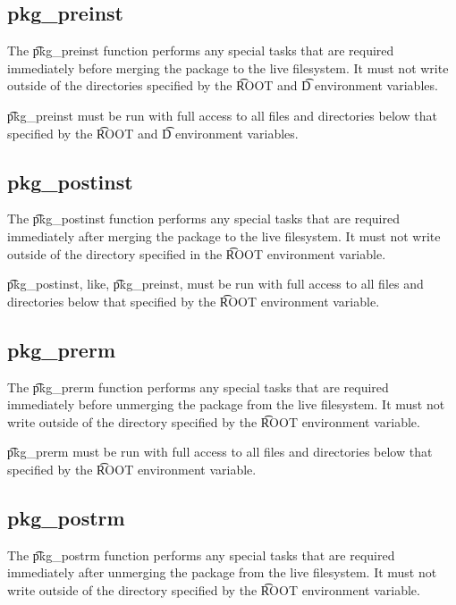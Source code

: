 \subsection{pkg\_preinst}
\label{pkg-preinst-function}

The \t{pkg\_preinst} function performs any special tasks that are required immediately before
merging the package to the live filesystem. It must not write outside of the directories specified
by the \t{ROOT} and \t{D} environment variables.

\t{pkg\_preinst} must be run with full access to all files and directories below that specified by
the \t{ROOT} and \t{D} environment variables.

\subsection{pkg\_postinst}
\label{pkg-postinst-function}

The \t{pkg\_postinst} function performs any special tasks that are required immediately after
merging the package to the live filesystem. It must not write outside of the directory specified
in the \t{ROOT} environment variable.

\t{pkg\_postinst}, like, \t{pkg\_preinst}, must be run with full access to all files and directories
below that specified by the \t{ROOT} environment variable.

\subsection{pkg\_prerm}
\label{pkg-prerm-function}

The \t{pkg\_prerm} function performs any special tasks that are required immediately before
unmerging the package from the live filesystem. It must not write outside of the directory specified
by the \t{ROOT} environment variable.

\t{pkg\_prerm} must be run with full access to all files and directories below that specified by
the \t{ROOT} environment variable.

\subsection{pkg\_postrm}
\label{pkg-postrm-function}

The \t{pkg\_postrm} function performs any special tasks that are required immediately after
unmerging the package from the live filesystem. It must not write outside of the directory specified
by the \t{ROOT} environment variable.

